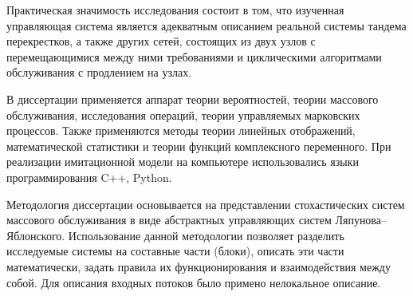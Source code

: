 Практическая значимость исследования состоит в том, что изученная управляющая система является адекватным описанием реальной системы тандема перекрестков, а также других сетей, состоящих из двух узлов с перемещающимися между ними требованиями и циклическими алгоритмами обслуживания с продлением на узлах.




{\methods}
В диссертации применяется аппарат теории вероятностей, теории массового обслуживания, исследования операций, теории управляемых марковских процессов. Также применяются методы теории линейных отображений, математической статистики и теории функций комплексного переменного.
 При реализации имитационной модели на компьютере использовались языки программирования C++, Python.

Методология диссертации основывается на   представлении стохастических систем массового обслуживания в виде абстрактных управляющих систем Ляпунова--Яблонского. Использование данной методологии  позволяет разделить исследуемые системы на составные части (блоки), описать эти части математически,  задать правила их функционирования и взаимодействия между собой.
Для описания входных потоков было примено нелокальное описание.






